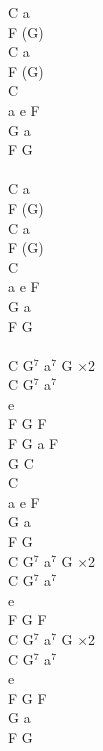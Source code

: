 \documentclass[a5paper, 10pt]{book}
\begin{document}
\begin{minipage}[t]{0.3\textwidth}
  C a\\
  F (G)\\
  C a\\
  F (G)\\
  C\\
  a e F\\
  G a\\
  F G\\
  \\
  C a\\
  F (G)\\
  C a\\
  F (G)\\
  C\\
  a e F\\
  G a\\
  F G\\
  \\
  C G$^7$ a$^7$ G  \hspace*{5mm}$\times$2\\
  C G$^7$ a$^7$\\
  e\\
  F G F\\
  F G a F\\
  G C\\

  C\\
  a e F\\
  G a\\
  F G\\

  C G$^7$ a$^7$ G  \hspace*{5mm}$\times$2\\
  C G$^7$ a$^7$\\
  e\\
  F G F\\

  C G$^7$ a$^7$ G  \hspace*{5mm}$\times$2\\
  C G$^7$ a$^7$\\
  e\\
  F G F\\
  G a\\
  F G\\

\end{minipage}

\newpage
\end{document}
